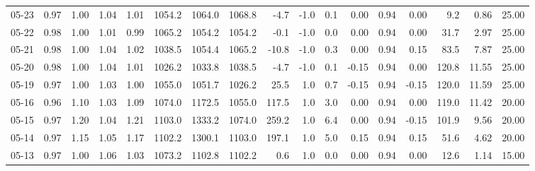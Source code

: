 \begin{threeparttable}
{\begin{tabular}{lrrrrrrrrrrrrrrrr}
  05-23 &         0.97 &           1.00 &          1.04 &          1.01 & 1054.2 & 1064.0 & 1068.8 &       -4.7 &                     -1.0 &                 0.1 &       0.00 &      0.94 &           0.00 &              9.2 &            0.86 &                  25.00 \\
  05-22 &         0.98 &           1.00 &          1.01 &          0.99 & 1065.2 & 1054.2 & 1054.2 &       -0.1 &                     -1.0 &                 0.0 &       0.00 &      0.94 &           0.00 &             31.7 &            2.97 &                  25.00 \\
  05-21 &         0.98 &           1.00 &          1.04 &          1.02 & 1038.5 & 1054.4 & 1065.2 &      -10.8 &                     -1.0 &                 0.3 &       0.00 &      0.94 &           0.15 &             83.5 &            7.87 &                  25.00 \\
  05-20 &         0.98 &           1.00 &          1.04 &          1.01 & 1026.2 & 1033.8 & 1038.5 &       -4.7 &                     -1.0 &                 0.1 &      -0.15 &      0.94 &           0.00 &            120.8 &           11.55 &                  25.00 \\
  05-19 &         0.97 &           1.00 &          1.03 &          1.00 & 1055.0 & 1051.7 & 1026.2 &       25.5 &                      1.0 &                 0.7 &      -0.15 &      0.94 &          -0.15 &            120.0 &           11.59 &                  25.00 \\
  05-16 &         0.96 &           1.10 &          1.03 &          1.09 & 1074.0 & 1172.5 & 1055.0 &      117.5 &                      1.0 &                 3.0 &       0.00 &      0.94 &           0.00 &            119.0 &           11.42 &                  20.00 \\
  05-15 &         0.97 &           1.20 &          1.04 &          1.21 & 1103.0 & 1333.2 & 1074.0 &      259.2 &                      1.0 &                 6.4 &       0.00 &      0.94 &          -0.15 &            101.9 &            9.56 &                  20.00 \\
  05-14 &         0.97 &           1.15 &          1.05 &          1.17 & 1102.2 & 1300.1 & 1103.0 &      197.1 &                      1.0 &                 5.0 &       0.15 &      0.94 &           0.15 &             51.6 &            4.62 &                  20.00 \\
  05-13 &         0.97 &           1.00 &          1.06 &          1.03 & 1073.2 & 1102.8 & 1102.2 &        0.6 &                      1.0 &                 0.0 &       0.00 &      0.94 &           0.00 &             12.6 &            1.14 &                  15.00 \\

\end{tabular}}
\end{threeparttable}
